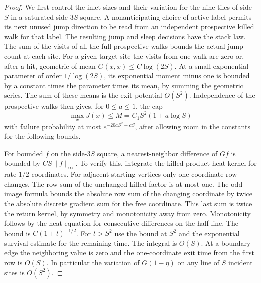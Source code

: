 \documentclass[11pt]{amsart}
\newcommand{\1}{\mathbf 1}
\begin{document}
\begin{proof}
We first control the inlet sizes and their variation for the nine tiles of side \(S\) in a saturated side-\(3S\) square. A nonanticipating choice of active label permits its next unused jump direction to be read from an independent prospective killed walk for that label. The resulting jump and sleep decisions have the stack law. The sum of the visits of all the full prospective walks bounds the actual jump count at each site. For a given target site the visits from one walk are zero or, after a hit, geometric of mean \(G(x,x)\le C\log(2S)\). At a small exponential parameter of order \(1/\log(2S)\), its exponential moment minus one is bounded by a constant times the parameter times its mean, by summing the geometric series. The sum of these means is the exit potential \(O(S^2)\). Independence of the prospective walks then gives, for \(0\le a\le1\), the cap
\[
 \max_x J(x)\le M=C_1 S^2(1+a\log S)
\]
with failure probability at most \(e^{-20aS^2-cS}\), after allowing room in the constants for the following bounds.

For bounded \(f\) on the side-\(3S\) square, a nearest-neighbor difference of \(Gf\) is bounded by \(CS\|f\|_\infty\). To verify this, integrate the killed product heat kernel for rate-\(1/2\) coordinates. For adjacent starting vertices only one coordinate row changes. The row sum of the unchanged killed factor is at most one. The odd-image formula bounds the absolute row sum of the changing coordinate by twice the absolute discrete gradient sum for the free coordinate. This last sum is twice the return kernel, by symmetry and monotonicity away from zero. Monotonicity follows by the heat equation for consecutive differences on the half-line. The bound is \(C(1+t)^{-1/2}\). For \(t>S^2\) use the bound at \(S^2\) and the exponential survival estimate for the remaining time. The integral is \(O(S)\). At a boundary edge the neighboring value is zero and the one-coordinate exit time from the first row is \(O(S)\). In particular the variation of \(G(1-\eta)\) on any line of \(S\) incident sites is \(O(S^2)\).


\end{proof}
\end{document}
